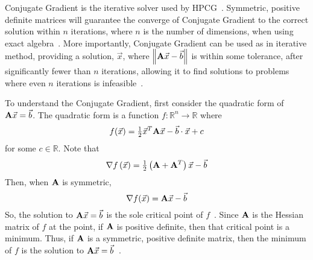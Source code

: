 Conjugate Gradient is the iterative solver used by HPCG~\cite{Dongarra:2015:HPCG}.
Symmetric, positive definite matrices will guarantee the converge of Conjugate Gradient to the correct solution within \(n\) iterations, where \(n\) is the number of dimensions, when using exact algebra~\cite{Saad:2003:IterativeMethods}.
More importantly, Conjugate Gradient can be used as in iterative method, providing a solution, \(\vec{x}\), where \(\left\|\mathbf{A}\vec{x}-\vec{b}\right\|\) is within some tolerance, after significantly fewer than \(n\) iterations, allowing it to find solutions to problems where even \(n\) iterations is infeasible~\cite{Shewchuk:1994:IntroToCG}.


To understand the Conjugate Gradient, first consider the quadratic form of \(\mathbf{A}\vec{x} = \vec{b}\).
The quadratic form is a function \(f:\mathbb{R}^n\to\mathbb{R}\) where
\begin{equation}
\label{eq:cg-quad-form}
	f(\vec{x}) = \tfrac{1}{2}\vec{x}^T\mathbf{A}\vec{x} - \vec{b}\cdot\vec{x} + c
\end{equation}
for some \(c\in\mathbb{R}\).
Note that
\[
	\nabla f\left(\vec{x}\right) = \tfrac{1}{2}\left(\mathbf{A}+\mathbf{A}^T\right)\vec{x}-\vec{b}
\]
Then, when \(\mathbf{A}\) is symmetric,
\begin{equation*}
	\nabla f(\vec{x}) = \mathbf{A}\vec{x} - \vec{b}
\end{equation*}
So, the solution to \(\mathbf{A}\vec{x} = \vec{b}\) is the sole critical point of \(f\)~\cite{Nearing:2010:toolsForPhysics}.
Since \(\mathbf{A}\) is the Hessian matrix of \(f\) at the point, if \(\mathbf{A}\) is positive definite, then that critical point is a minimum.
Thus, if \(\mathbf{A}\) is a symmetric, positive definite matrix, then the minimum of \(f\) is the solution to \(\mathbf{A}\vec{x} = \vec{b}\)~\cite{Shewchuk:1994:IntroToCG}.

